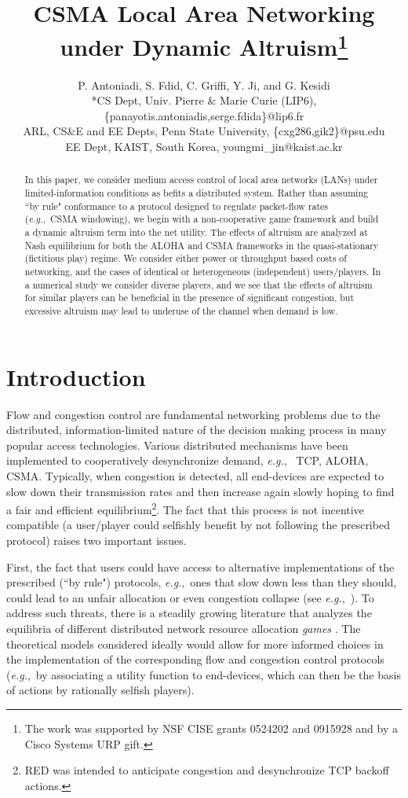 \documentclass[12pt,onecolumn,draftcls]{IEEEtran}
\title{CSMA Local Area Networking\\ under Dynamic Altruism\thanks{The work 
was supported by NSF CISE grants 0524202 and 0915928
and by a Cisco Systems URP gift.}
}
\author{
P. Antoniadi, S. Fdid, 
C. Griffi, Y. Ji, and 
G. Kesidi\\
*CS Dept, Univ. Pierre \& Marie Curie (LIP6), 
\{panayotis.antoniadis,serge.fdida\}@lip6.fr \\
 ARL, CS\&E and EE Depts, Penn State University, 
\{cxg286,gik2\}@psu.edu   \\
  EE Dept, KAIST, South Korea, youngmi\_jin@kaist.ac.kr
}
\newcommand{\eg}{{\em e.g.},~}
\begin{document}
\maketitle

\begin{abstract}
In this paper, we consider medium access control of local area networks
(LANs) under limited-information conditions as befits a distributed system.
Rather than assuming ``by rule" conformance to a protocol designed to
regulate packet-flow rates (\eg CSMA windowing), we begin with a
non-cooperative game framework and build a dynamic altruism term into the
net utility. The effects of altruism are analyzed at Nash equilibrium for
both the ALOHA and CSMA frameworks in the quasi-stationary (fictitious
play) regime. We consider either power or throughput based costs of
networking, and the cases of identical or heterogeneous (independent)
users/players. 
In a numerical study we consider diverse players, 
and we see that the effects of altruism for similar players can be
beneficial in the presence of significant congestion, but excessive
altruism may lead to underuse of the channel when demand is low.
\end{abstract}

\section{Introduction}

Flow and congestion control are fundamental networking problems due to the
distributed, information-limited nature of the decision making process in
many popular access technologies. Various distributed 
mechanisms have been implemented to cooperatively desynchronize demand, \eg
TCP, ALOHA, CSMA.  Typically, when congestion is detected, all end-devices
are expected to slow down their transmission rates and then increase again
slowly hoping to find a fair and efficient equilibrium\footnote{RED 
\cite{Lyles99} was intended to anticipate congestion and desynchronize 
TCP backoff actions.}.
The fact that this process is not incentive compatible (a user/player 
could selfishly benefit by not
following the prescribed protocol) raises two important issues. 

First, the fact that users could have access to alternative implementations
of the prescribed (``by rule") protocols, \eg ones that slow down less than
they should, could lead to an unfair allocation or even congestion
collapse (see \eg  \cite{Cagalj05, Raya06}).  To address such threats,
there is a steadily growing literature that analyzes the equilibria of
different distributed network resource allocation {\em games}
\cite{Yaiche00, Jin02b, Basar02, Wicker03, Jin05, Cagalj05, Chiang06,
Lee07, Long07, Jin07, Cui08, Ma09}.  The theoretical models considered
ideally would allow for more informed choices in the implementation of the
corresponding flow and
congestion control protocols (\eg by associating a utility
function to end-devices, which can then be the basis of actions by
rationally selfish players). 
\end{document}
